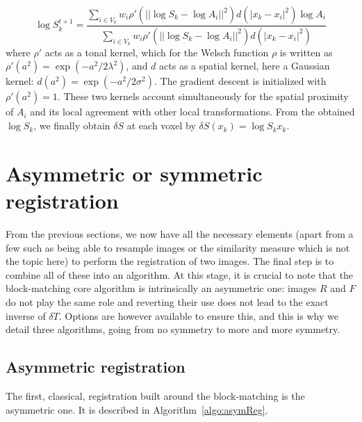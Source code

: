 \begin{equation}
	\log S_k^{t+1} = \frac{\sum_{i \in V_k} w_i \rho'\left( || \log S_k - \log A_i||^2 \right)d\left( |x_k - x_i|^2 \right) \log A_i}{\sum_{i \in V_k} w_i \rho'\left( || \log S_k - \log A_i||^2 \right)d\left( |x_k - x_i|^2 \right)}
\end{equation}
where $\rho'$ acts as a tonal kernel, which for the Welsch function $\rho$ is written as $\rho'(a^2) = \exp\left(-a^2 / 2\lambda^2\right)$, and $d$ acts as a spatial kernel, here a Gaussian kernel: $d(a^2) = \exp\left(- a^2 / 2\sigma^2\right)$. The gradient descent is initialized with $\rho'(a^2) = 1$. These two kernels account simultaneously for the spatial proximity of $A_i$ and its local agreement with other local transformations. From the obtained $\log S_k$, we finally obtain $\delta S$ at each voxel by $\delta S(x_k) = \log S_k x_k$.


\section{Asymmetric or symmetric registration}
\label{sec:reg-algorithms}

From the previous sections, we now have all the necessary elements (apart from a few such as being able to resample images or the similarity measure which is not the topic here) to perform the registration of two images. The final step is to combine all of these into an algorithm. At this stage, it is crucial to note that the block-matching core algorithm is intrinsically an asymmetric one: images $R$ and $F$ do not play the same role and reverting their use does not lead to the exact inverse of $\delta T$. Options are however available to ensure this, and this is why we detail three algorithms, going from no symmetry to more and more symmetry.

\subsection{Asymmetric registration} %
\label{sub:asymmetric_registration}

The first, classical, registration built around the block-matching is the asymmetric one. It is described in Algorithm~\ref{algo:asymReg}.

